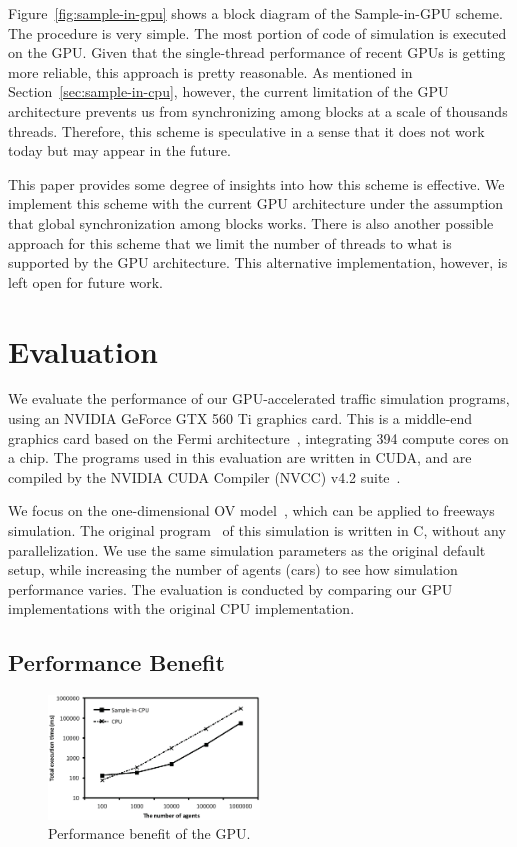 \documentclass[times, 10pt, twocolumn]{article}
\begin{document}
Figure~\ref{fig:sample-in-gpu} shows a block diagram of the
Sample-in-GPU scheme.
The procedure is very simple.
The most portion of code of simulation is executed on the GPU.
Given that the single-thread performance of recent GPUs is getting more
reliable, this approach is pretty reasonable.
As mentioned in Section~\ref{sec:sample-in-cpu}, however, the current
limitation of the GPU architecture prevents us from synchronizing among
blocks at a scale of thousands threads.
Therefore, this scheme is speculative in a sense that it does not work today
but may appear in the future.

This paper provides some degree of insights into how this scheme is
effective.
We implement this scheme with the current GPU architecture under the
assumption that global synchronization among blocks works.
There is also another possible approach for this scheme that we limit
the number of threads to what is supported by the GPU architecture.
This alternative implementation, however, is left open for future work.

\section{Evaluation}
\label{sec:evaluation}

We evaluate the performance of our GPU-accelerated traffic simulation
programs, using an NVIDIA GeForce GTX 560 Ti graphics card.
This is a middle-end graphics card based on the Fermi
architecture~\cite{NVIDIA_Fermi}, integrating 394 compute cores on a chip.
The programs used in this evaluation are written in CUDA, and are
compiled by the NVIDIA CUDA Compiler (NVCC) v4.2 suite~\cite{CUDA42}.

We focus on the one-dimensional OV model~\cite{Bando1995, Bando1995_2},
which can be applied to freeways simulation.
The original program~\cite{OV_Program} of this simulation is written in
C, without any parallelization.
We use the same simulation parameters as the original default setup,
while increasing the number of agents (cars) to see how simulation
performance varies. 
The evaluation is conducted by comparing our GPU implementations with
the original CPU implementation.

\subsection{Performance Benefit}

\begin{figure}[t]
\centering
\includegraphics[width=0.5\textwidth]{eps/eval_accel.eps}
\caption{Performance benefit of the GPU.}
\label{fig:eval_benefit}
\end{figure}
\end{document}
